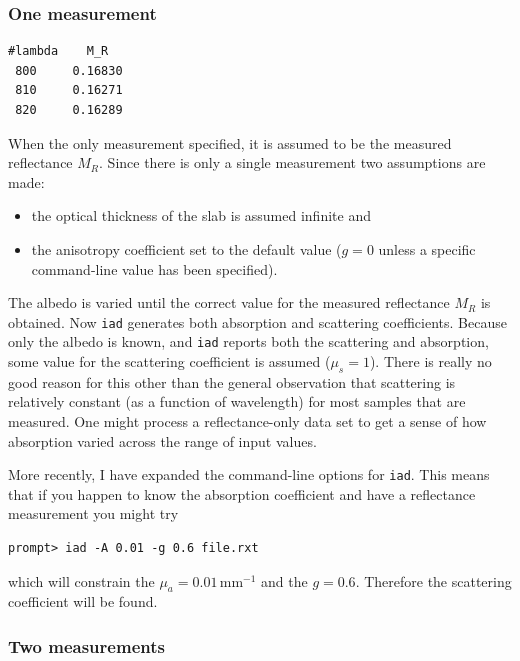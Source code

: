 \documentclass{article}
\newcommand\iadprog{\texttt{iad}}
\begin{document}
\subsubsection{One measurement}

\begin{center}
\begin{minipage}{3cm}
\scriptsize
\begin{verbatim}
#lambda	   M_R  
 800     0.16830
 810     0.16271
 820     0.16289
\end{verbatim}
\end{minipage}
\end{center}

When the only measurement specified, it is assumed to be the measured reflectance $M_R$.
Since there is only a single measurement two assumptions are made:
\begin{itemize}
\item
the optical thickness of the slab is assumed infinite and 
\item 
the anisotropy
coefficient set to the default value ($g=0$ unless a specific command-line 
value has been specified).  
\end{itemize}
The albedo is varied until the correct value
for the measured reflectance $M_R$ is obtained.  Now \iadprog{} generates both absorption
and scattering coefficients.  Because only the albedo is known,
and \iadprog{} reports both the scattering and absorption, some value for the
scattering coefficient is assumed ($\mu_s=1$).  There is really no good reason for this
other than the general observation that scattering is relatively constant
(as a function of wavelength) for most samples that are measured.  One might 
process a reflectance-only data set to get a 
sense of how absorption varied across the range of input values.

More recently, I have expanded the command-line options for \iadprog{}.  This
means that if you happen to know the absorption coefficient and have a reflectance
measurement you might try
\begin{verbatim}
prompt> iad -A 0.01 -g 0.6 file.rxt
\end{verbatim}
which will constrain the $\mu_a=0.01$\,mm$^{-1}$ and the $g=0.6$.  Therefore
the scattering coefficient will be found.

\subsubsection{Two measurements}
\end{document}
